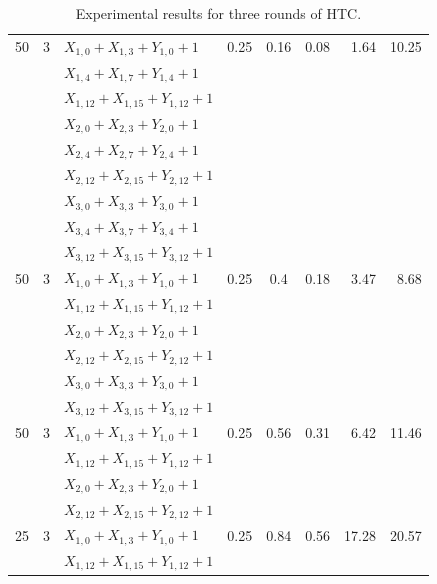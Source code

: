 \begin{table}[ht]
\begin{small}
\begin{center}
\begin{tabular}{|c|r|l|c|c|c|r|r|}
\hline %

50 & 3 & $X_{1, 0} + X_{1, 3} + Y_{1, 0} + 1$ & 0.25 & 0.16	& 0.08 & 1.64 &10.25\\
   &   & $X_{1, 4} + X_{1, 7} + Y_{1, 4} + 1$ & & & & & \\
   &   & $X_{1,12} + X_{1,15} + Y_{1,12} + 1$ & & & & & \\
   &   & $X_{2, 0} + X_{2, 3} + Y_{2, 0} + 1$ & & & & & \\
   &   & $X_{2, 4} + X_{2, 7} + Y_{2, 4} + 1$ & & & & & \\
   &   & $X_{2,12} + X_{2,15} + Y_{2,12} + 1$ & & & & & \\
   &   & $X_{3, 0} + X_{3, 3} + Y_{3, 0} + 1$ & & & & & \\
   &   & $X_{3, 4} + X_{3, 7} + Y_{3, 4} + 1$ & & & & & \\
   &   & $X_{3,12} + X_{3,15} + Y_{3,12} + 1$ & & & & & \\

\hline

50 & 3 & $X_{1, 0} + X_{1, 3} + Y_{1, 0} + 1$ & 0.25 & 0.4 & 0.18 & 3.47 &8.68\\
   &   & $X_{1,12} + X_{1,15} + Y_{1,12} + 1$ & & & & & \\
   &   & $X_{2, 0} + X_{2, 3} + Y_{2, 0} + 1$ & & & & & \\
   &   & $X_{2,12} + X_{2,15} + Y_{2,12} + 1$ & & & & & \\
   &   & $X_{3, 0} + X_{3, 3} + Y_{3, 0} + 1$ & & & & & \\
   &   & $X_{3,12} + X_{3,15} + Y_{3,12} + 1$ & & & & & \\

\hline

50 & 3 & $X_{1, 0} + X_{1, 3} + Y_{1, 0} + 1$ & 0.25 & 0.56 & 0.31 & 6.42 & 11.46\\
   &   & $X_{1,12} + X_{1,15} + Y_{1,12} + 1$ & & & & & \\
   &   & $X_{2, 0} + X_{2, 3} + Y_{2, 0} + 1$ & & & & & \\
   &   & $X_{2,12} + X_{2,15} + Y_{2,12} + 1$ & & & & & \\

\hline

25 & 3 & $X_{1, 0} + X_{1, 3} + Y_{1, 0} + 1$ & 0.25 & 0.84 & 0.56 & 17.28 & 20.57\\
   &   & $X_{1,12} + X_{1,15} + Y_{1,12} + 1$ & & & & & \\

\hline
\end{tabular}
\end{center}
\end{small}
\caption{Experimental results for three rounds of HTC.}
\label{tab:exp-3-rounds}
\end{table}

